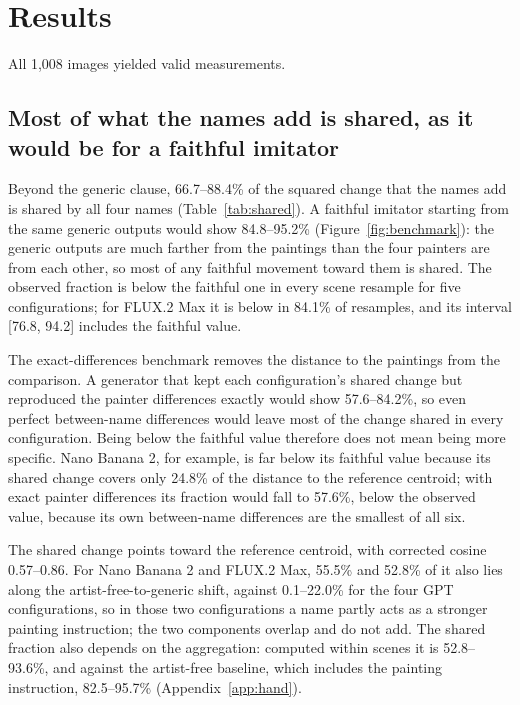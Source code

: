\documentclass[10pt]{article}
\begin{document}
\section{Results}\label{sec:results}

All 1,008 images yielded valid measurements.

\subsection{Most of what the names add is shared, as it would be for a faithful imitator}\label{sec:shared}



Beyond the generic clause, 66.7--88.4\% of the squared change that the names add is shared by all
four names (Table~\ref{tab:shared}). A faithful imitator starting from the same generic outputs
would show 84.8--95.2\% (Figure~\ref{fig:benchmark}): the generic outputs are much farther from the
paintings than the four painters are from each other, so most of any faithful movement toward them
is shared. The observed fraction is below the faithful one in every scene resample for five
configurations; for FLUX.2 Max it is below in 84.1\% of resamples, and its interval [76.8, 94.2]
includes the faithful value.

The exact-differences benchmark removes the distance to the paintings from the comparison. A
generator that kept each configuration's shared change but reproduced the painter differences
exactly would show 57.6--84.2\%, so even perfect between-name differences would leave most of the
change shared in every configuration. Being below the faithful value therefore does not mean being
more specific. Nano Banana 2, for example, is far below its faithful value because its shared
change covers only 24.8\% of the distance to the reference centroid; with exact painter differences
its fraction would fall to 57.6\%, below the observed value, because its own between-name
differences are the smallest of all six.

The shared change points toward the reference centroid, with corrected cosine 0.57--0.86. For Nano
Banana 2 and FLUX.2 Max, 55.5\% and 52.8\% of it also lies along the artist-free-to-generic shift,
against 0.1--22.0\% for the four GPT configurations, so in those two configurations a name partly
acts as a stronger painting instruction; the two components overlap and do not add. The shared
fraction also depends on the aggregation: computed within scenes it is 52.8--93.6\%, and against
the artist-free baseline, which includes the painting instruction, 82.5--95.7\%
(Appendix~\ref{app:hand}).
\end{document}
